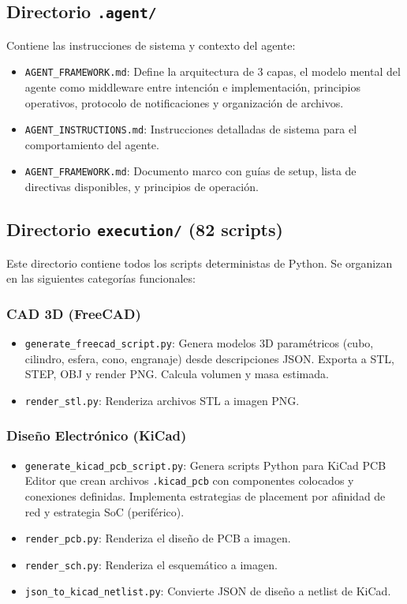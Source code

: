 \documentclass[12pt, a4paper]{article}
\begin{document}
\subsection{Directorio \texttt{.agent/}}

Contiene las instrucciones de sistema y contexto del agente:
\begin{itemize}[leftmargin=*]
    \item \texttt{AGENT\_FRAMEWORK.md}: Define la arquitectura de 3 capas, el modelo mental del agente como middleware entre intención e implementación, principios operativos, protocolo de notificaciones y organización de archivos.
    \item \texttt{AGENT\_INSTRUCTIONS.md}: Instrucciones detalladas de sistema para el comportamiento del agente.
    \item \texttt{AGENT\_FRAMEWORK.md}: Documento marco con guías de setup, lista de directivas disponibles, y principios de operación.
\end{itemize}

\subsection{Directorio \texttt{execution/} (82 scripts)}

Este directorio contiene todos los scripts deterministas de Python. Se organizan en las siguientes categorías funcionales:

\subsubsection*{CAD 3D (FreeCAD)}
\begin{itemize}[leftmargin=*]
    \item \texttt{generate\_freecad\_script.py}: Genera modelos 3D paramétricos (cubo, cilindro, esfera, cono, engranaje) desde descripciones JSON. Exporta a STL, STEP, OBJ y render PNG. Calcula volumen y masa estimada.
    \item \texttt{render\_stl.py}: Renderiza archivos STL a imagen PNG.
\end{itemize}

\subsubsection*{Diseño Electrónico (KiCad)}
\begin{itemize}[leftmargin=*]
    \item \texttt{generate\_kicad\_pcb\_script.py}: Genera scripts Python para KiCad PCB Editor que crean archivos \texttt{.kicad\_pcb} con componentes colocados y conexiones definidas. Implementa estrategias de placement por afinidad de red y estrategia SoC (periférico).
    \item \texttt{render\_pcb.py}: Renderiza el diseño de PCB a imagen.
    \item \texttt{render\_sch.py}: Renderiza el esquemático a imagen.
    \item \texttt{json\_to\_kicad\_netlist.py}: Convierte JSON de diseño a netlist de KiCad.
\end{itemize}
\end{document}
